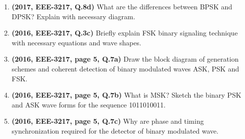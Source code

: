 \documentclass[12pt, a4paper]{article}
\begin{document}
\begin{enumerate}
		\item \textbf{(2017, EEE-3217, Q.8d)} What are the differences between BPSK and DPSK? Explain with necessary diagram.
		
		\item \textbf{(2016, EEE-3217, Q.3c)} Briefly explain FSK binary signaling technique with necessary equations and wave shapes.
		
		\item \textbf{(2016, EEE-3217, page 5, Q.7a)} Draw the block diagram of generation schemes and coherent detection of binary modulated waves ASK, PSK and FSK.
		
		\item \textbf{(2016, EEE-3217, page 5, Q.7b)} What is MSK? Sketch the binary PSK and ASK wave forms for the sequence 1011010011.
		
		\item \textbf{(2016, EEE-3217, page 5, Q.7c)} Why are phase and timing synchronization required for the detector of binary modulated wave.
		
	\end{enumerate}
	
\end{document}
